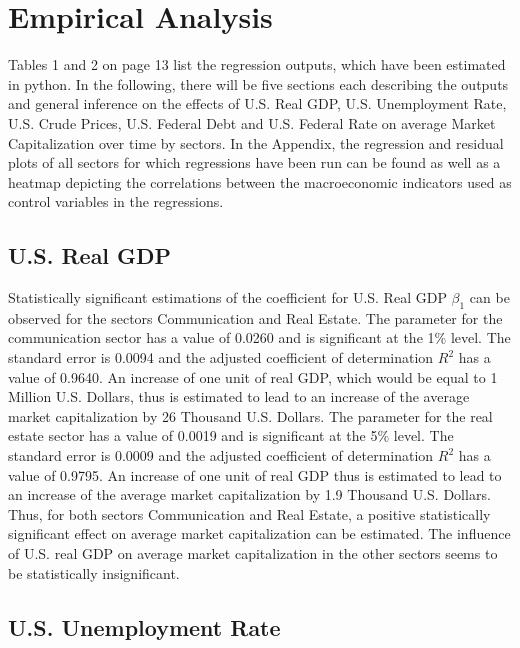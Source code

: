 \documentclass[a4paper,12pt]{article}
\begin{document}
\clearpage

\section{Empirical Analysis}

Tables 1 and 2 on page 13 list the regression outputs, which have been estimated in python.
In the following, there will be five sections each describing the outputs and general inference on the effects of U.S. Real GDP, U.S. Unemployment Rate, U.S. Crude Prices, U.S. Federal Debt and U.S. Federal Rate on average Market Capitalization over time by sectors. In the Appendix, the regression and residual plots of all sectors for which regressions have been run can be found as well as a heatmap depicting the correlations between the macroeconomic indicators used as control variables in the regressions.

\subsection{U.S. Real GDP}

Statistically significant estimations of the coefficient for U.S. Real GDP $\beta_1$ can be observed for the sectors Communication and Real Estate. The parameter for the communication sector has a value of 0.0260 and is significant at the 1$\%$ level. The standard error is 0.0094 and the adjusted coefficient of determination ${R}^2$ has a value of 0.9640. An increase of one unit of real GDP, which would be equal to 1 Million U.S. Dollars, thus is estimated to lead to an increase of the average market capitalization by 26 Thousand U.S. Dollars. The parameter for the real estate sector has a value  of 0.0019 and is significant at the 5$\%$ level. The standard error is 0.0009 and the adjusted coefficient of determination ${R}^2$ has a value of 0.9795. An increase of one unit of real GDP thus is estimated to lead to an increase of the average market capitalization by 1.9 Thousand U.S. Dollars. Thus, for both sectors Communication and Real Estate, a positive statistically significant effect on average market capitalization can be estimated. The influence of U.S. real GDP on average market capitalization in the other sectors seems to be statistically insignificant.

\subsection{U.S. Unemployment Rate}
\end{document}
